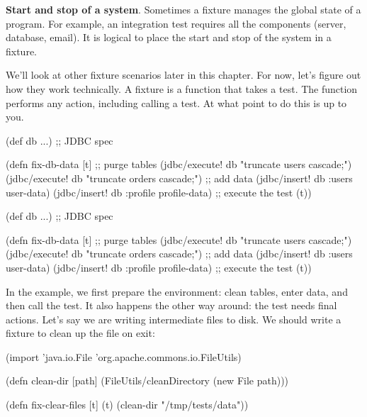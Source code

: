 \textbf{Start and stop of a system}. Sometimes a fixture manages the global state of a program. For example, an integration test requires all the components (server, database, email). It is logical to place the start and stop of the system in a fixture.

We'll look at other fixture scenarios later in this chapter. For now, let's figure out how they work technically. A fixture is a function that takes a test. The function performs any action, including calling a test. At what point to do this is up to you.


\ifx\DEVICETYPE\MOBILE

\begin{english}
  \begin{clojure}
(def db {...}) ;; JDBC spec

(defn fix-db-data [t]
  ;; purge tables
  (jdbc/execute! db
    "truncate users cascade;")
  (jdbc/execute! db
    "truncate orders cascade;")
  ;; add data
  (jdbc/insert! db :users user-data)
  (jdbc/insert! db
    :profile profile-data)
  ;; execute the test
  (t))
  \end{clojure}
\end{english}

\else

\begin{english}
  \begin{clojure}
(def db {...}) ;; JDBC spec

(defn fix-db-data [t]
  ;; purge tables
  (jdbc/execute! db "truncate users cascade;")
  (jdbc/execute! db "truncate orders cascade;")
  ;; add data
  (jdbc/insert! db :users user-data)
  (jdbc/insert! db :profile profile-data)
  ;; execute the test
  (t))
  \end{clojure}
\end{english}

\fi

In the example, we first prepare the environment: clean tables, enter data, and then call the test. It also happens the other way around: the test needs final actions. Let's say we are writing intermediate files to disk. We should write a fixture to clean up the file on exit:

\ifx\DEVICETYPE\MOBILE

\begin{english}
  \begin{clojure}
(import 'java.io.File
        'org.apache.commons.io.FileUtils)

(defn clean-dir [path]
  (FileUtils/cleanDirectory
    (new File path)))

(defn fix-clear-files [t]
  (t)
  (clean-dir "/tmp/tests/data"))
  \end{clojure}
\end{english}


